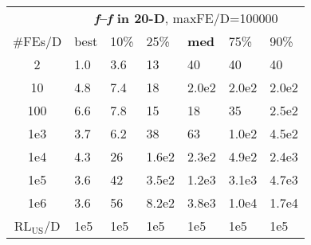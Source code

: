 \begin{tabular}{c|llllll}
 & \multicolumn{6}{|c}{\textbf{\textit{f}\raisebox{-0.35ex}{1}--\textit{f}\raisebox{-0.35ex}{24} in 20-D}, maxFE/D=100000}\\
\#FEs/D & best & 10\% & 25\% & \textbf{med} & 75\% & 90\%\\
2 & \hspace*{1ex}1.0 & \hspace*{1ex}3.6 & 13 & 40 & 40 & 40\\
10 & \hspace*{1ex}4.8 & \hspace*{1ex}7.4 & 18 & 2.0e2 & 2.0e2 & 2.0e2\\
100 & \hspace*{1ex}6.6 & \hspace*{1ex}7.8 & 15 & 18 & 35 & 2.5e2\\
1e3 & \hspace*{1ex}3.7 & \hspace*{1ex}6.2 & 38 & 63 & 1.0e2 & 4.5e2\\
1e4 & \hspace*{1ex}4.3 & 26 & 1.6e2 & 2.3e2 & 4.9e2 & 2.4e3\\
1e5 & \hspace*{1ex}3.6 & 42 & 3.5e2 & 1.2e3 & 3.1e3 & 4.7e3\\
1e6 & \hspace*{1ex}3.6 & 56 & 8.2e2 & 3.8e3 & 1.0e4 & 1.7e4\\
$\text{RL}_{\text{US}}$/D & 1e5 & 1e5 & 1e5 & 1e5 & 1e5 & 1e5
\end{tabular}
